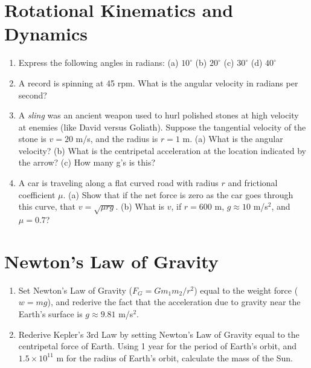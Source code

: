 \documentclass[10pt]{article}
\begin{document}
\maketitle
\small
\section{Rotational Kinematics and Dynamics}
\begin{enumerate}
\item Express the following angles in radians: (a) $10^{\circ}$ (b) $20^{\circ}$ (c) $30^{\circ}$ (d) $40^{\circ}$ \\ \vspace{1cm}
\item A record is spinning at 45 rpm.  What is the angular velocity in radians per second? \\ \vspace{1cm}
\item A \textit{sling} was an ancient weapon used to hurl polished stones at high velocity at enemies (like David versus Goliath).  Suppose the tangential velocity of the stone is $v=20$ m/s, and the radius is $r=1$ m.  (a) What is the angular velocity? (b) What is the centripetal acceleration at the location indicated by the arrow? (c) How many g's is this? \\ \vspace{1cm}
\item A car is traveling along a flat curved road with radius $r$ and frictional coefficient $\mu$.  (a) Show that if the net force is zero as the car goes through this curve, that $v = \sqrt{\mu rg}$. (b) What is $v$, if $r=600$ m, $g\approx 10$ m/s$^2$, and $\mu = 0.7$? \\ \vspace{0.5cm}
\end{enumerate}
\section{Newton's Law of Gravity}
\begin{enumerate}
\item Set Newton's Law of Gravity ($F_G = G m_1 m_2 / r^2$) equal to the weight force ($w = mg$), and rederive the fact that the acceleration due to gravity near the Earth's surface is $g\approx 9.81$ m/s$^2$. \\ \vspace{1cm}
\item Rederive Kepler's 3rd Law by setting Newton's Law of Gravity equal to the centripetal force of Earth. Using 1 year for the period of Earth's orbit, and $1.5 \times 10^{11}$ m for the radius of Earth's orbit, calculate the mass of the Sun. \\ \vspace{0.5cm}
\end{enumerate}
\end{document}
